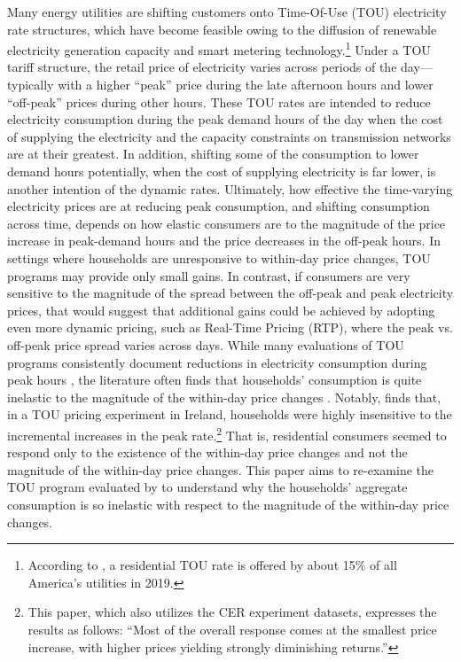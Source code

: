 Many energy utilities are shifting customers onto Time-Of-Use (TOU) electricity rate structures, which have become feasible owing to the diffusion of renewable electricity generation capacity and smart metering technology.\footnote{According to \cite{A-Survey-of-Residential-TOU-Rates_FHS_2019}, a residential TOU rate is offered by about 15\% of all America's utilities in 2019.} Under a TOU tariff structure, the retail price of electricity varies across periods of the day---typically with a higher ``peak'' price during the late afternoon hours and lower ``off-peak'' prices during other hours. These TOU rates are intended to reduce electricity consumption during the peak demand hours of the day when the cost of supplying the electricity and the capacity constraints on transmission networks are at their greatest. In addition, shifting some of the consumption to lower demand hours potentially, when the cost of supplying electricity is far lower, is another intention of the dynamic rates. Ultimately, how effective the time-varying electricity prices are at reducing peak consumption, and shifting consumption across time, depends on how elastic consumers are to the magnitude of the price increase in peak-demand hours and the price decreases in the off-peak hours. In settings where households are unresponsive to within-day price changes, TOU programs may provide only small gains. In contrast, if consumers are very sensitive to the magnitude of the spread between the off-peak and peak electricity prices, that would suggest that additional gains could be achieved by adopting even more dynamic pricing, such as Real-Time Pricing (RTP), where the peak vs. off-peak price spread varies across days. While many evaluations of TOU programs consistently document reductions in electricity consumption during peak hours \citep{Quantifying-Customer-Response-to-Dynamic-Pricing_Faruqui-and-George_2005, Dynamic-Pricing-of-Electricity-in-the-Mid-Atlantic-Region_Econometric-Results-from-the-Baltimore-Gas-and-Electric-Company-Experiment_Faruqui-et-al_2011, Dynamic-Pricing-of-Electricity-for-Residential-Customers_The-Evidence-from-Michigan_Faruqui-et-al_2013}, the literature often finds that households' consumption is quite inelastic to the magnitude of the within-day price changes \citep{Rethinking-Real-Time-Electricity-Pricing_Allcott_2011, Knowledge-is-Less-Power_Jessoe-and-Rapson_2014}. Notably, \cite{Peaking-Interest:How-Awareness-Drives-the-Effectiveness-of-Time-of-Use-Electricity-Pricing_Prest_2020} finds that, in a TOU pricing experiment in Ireland, households were highly insensitive to the incremental increases in the peak rate.\footnote{This paper, which also utilizes the CER experiment datasets, expresses the results as follows: ``Most of the overall response comes at the smallest price increase, with higher prices yielding strongly diminishing returns.''} That is, residential consumers seemed to respond only to the existence of the within-day price changes and not the magnitude of the within-day price changes. This paper aims to re-examine the TOU program evaluated by \cite{Peaking-Interest:How-Awareness-Drives-the-Effectiveness-of-Time-of-Use-Electricity-Pricing_Prest_2020} to understand why the households' aggregate consumption is so inelastic with respect to the magnitude of the within-day price changes. 


